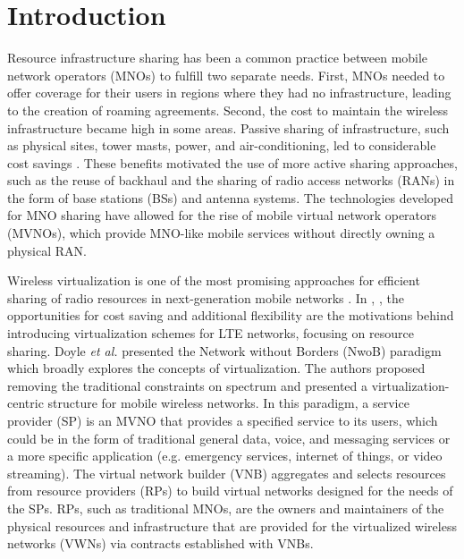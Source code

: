 \documentclass[onecolumn,draftcls]{IEEEtran}
\begin{document}




%
\IEEEpeerreviewmaketitle



\section{Introduction} \label{sec:intro}
Resource infrastructure sharing has been a common practice between mobile network operators (MNOs) to fulfill two separate needs.  First, MNOs needed to offer coverage for their users in regions where they had no infrastructure, leading to the creation of roaming agreements.  Second, the cost to maintain the wireless infrastructure became high in some areas.  Passive sharing of infrastructure, such as physical sites, tower masts, power, and air-conditioning, led to considerable cost savings \cite{1421931}.  These benefits motivated the use of more active sharing approaches, such as the reuse of backhaul and the sharing of radio access networks (RANs) in the form of base stations (BSs) and antenna systems.  The technologies developed for MNO sharing have allowed for the rise of mobile virtual network operators (MVNOs), which provide MNO-like mobile services without directly owning a physical RAN.

Wireless virtualization is one of the most promising approaches for efficient sharing of radio resources in next-generation mobile networks \cite{6824752}.  In \cite{6553675}, \cite{6571315}, the opportunities for cost saving and additional flexibility are the motivations behind introducing virtualization schemes for LTE networks, focusing on resource sharing.  Doyle \textit{et al.} \cite{6737248} presented the Network without Borders (NwoB) paradigm which broadly explores the concepts of virtualization.  The authors proposed removing the traditional constraints on spectrum and presented a virtualization-centric structure for mobile wireless networks.  In this paradigm, a service provider (SP) is an MVNO that provides a specified service to its users, which could be in the form of traditional general data, voice, and messaging services or a more specific application (e.g. emergency services, internet of things, or video streaming).  The virtual network builder (VNB) aggregates and selects resources from resource providers (RPs) to build virtual networks designed for the needs of the SPs.  RPs, such as traditional MNOs, are the owners and maintainers of the physical resources and infrastructure that are provided for the virtualized wireless networks (VWNs) via contracts established with VNBs.
\end{document}
